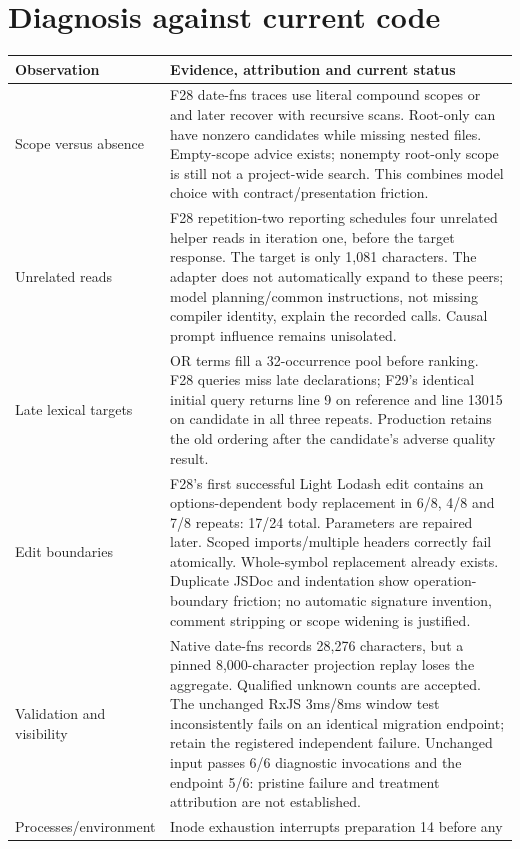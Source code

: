 \documentclass[11pt,a4paper]{article}
\newcommand{\code}[1]{\texttt{\detokenize{#1}}}
\begin{document}
\section{Diagnosis against current code}
\begin{longtable}{@{}p{.22\linewidth}p{.71\linewidth}@{}}
\toprule Observation & Evidence, attribution and current status \\\midrule\endhead
Scope versus absence & F28 date-fns traces use literal compound scopes or
\code{*} and later recover with recursive scans. Root-only \code{*} can have
nonzero candidates while missing nested files. Empty-scope advice exists;
nonempty root-only scope is still not a project-wide search. This combines
model choice with contract/presentation friction. \\
Unrelated reads & F28 repetition-two reporting schedules four unrelated
helper reads in iteration one, before the target response. The target is only
1,081 characters. The adapter does not automatically expand to these peers;
model planning/common instructions, not missing compiler identity, explain the
recorded calls. Causal prompt influence remains unisolated. \\
Late lexical targets & OR terms fill a 32-occurrence pool before ranking.
F28 \code{function keys/values} queries miss late declarations; F29's identical
initial \code{function forIn} query returns line 9 on reference and line 13015
on candidate in all three repeats. Production retains the old ordering after
the candidate's adverse quality result. \\
Edit boundaries & F28's first successful Light Lodash edit contains an
options-dependent body replacement in 6/8, 4/8 and 7/8 repeats: 17/24 total.
Parameters are repaired later. Scoped imports/multiple headers correctly fail
atomically. Whole-symbol replacement already exists. Duplicate JSDoc and
indentation show operation-boundary friction; no automatic signature invention,
comment stripping or scope widening is justified. \\
Validation and visibility & Native date-fns records 28,276 characters, but a
pinned 8,000-character projection replay loses the aggregate. Qualified unknown
counts are accepted. The unchanged RxJS 3ms/8ms window test inconsistently fails
on an identical migration endpoint; retain the registered independent failure.
Unchanged input passes 6/6 diagnostic invocations and the endpoint 5/6: pristine
failure and treatment attribution are not established. \\
Processes/environment & Inode exhaustion interrupts preparation 14 before any

\end{longtable}
\end{document}
